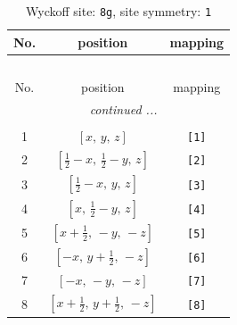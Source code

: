 \documentclass[fleqn,8pt]{jsarticle}
\begin{document}
\renewcommand{\arraystretch}{1.2}
\begin{longtable}{ccc}
\caption{Wyckoff site: {\tt 8g}, site symmetry: {\tt 1}}
 \\
 \hline \hline
No. & position & mapping \\ \hline \endfirsthead

\multicolumn{2}{l}{\tablename\ \thetable{}} \\
 \hline \hline
No. & position & mapping \\ \hline \endhead

 \hline \hline
\multicolumn{2}{r}{\footnotesize\it continued ...} \\ \endfoot

 \hline \hline
\multicolumn{2}{r}{} \\ \endlastfoot

1 & $\left[ x,\, y,\, z \right]$ & {\tt [1]} \\ \hline
2 & $\left[ \frac{1}{2} - x,\, \frac{1}{2} - y,\, z \right]$ & {\tt [2]} \\ \hline
3 & $\left[ \frac{1}{2} - x,\, y,\, z \right]$ & {\tt [3]} \\ \hline
4 & $\left[ x,\, \frac{1}{2} - y,\, z \right]$ & {\tt [4]} \\ \hline
5 & $\left[ x + \frac{1}{2},\, - y,\, - z \right]$ & {\tt [5]} \\ \hline
6 & $\left[ - x,\, y + \frac{1}{2},\, - z \right]$ & {\tt [6]} \\ \hline
7 & $\left[ - x,\, - y,\, - z \right]$ & {\tt [7]} \\ \hline
8 & $\left[ x + \frac{1}{2},\, y + \frac{1}{2},\, - z \right]$ & {\tt [8]} \\
\end{longtable}
\end{document}
